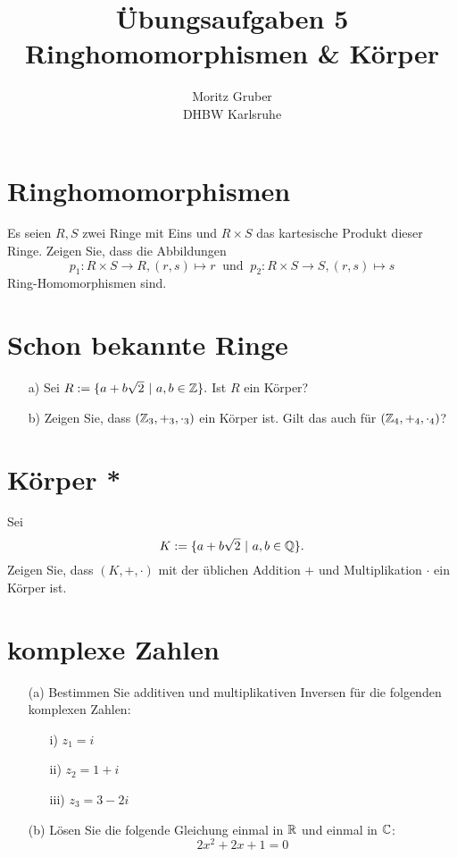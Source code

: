 \documentclass[
				a4paper,
				10pt
			]
			{scrartcl}
\author{Moritz Gruber\\ DHBW Karlsruhe}
\title{\"Ubungsaufgaben 5\\ 
	Ringhomomorphismen \& K\"orper
}
\date{}
\begin{document}
\maketitle
\section{Ringhomomorphismen}
Es seien $R,S$ zwei Ringe mit Eins und $R\times S$ das kartesische Produkt dieser Ringe. Zeigen Sie, dass die Abbildungen
		$$p_1 : R\times S \to R, (r,s) \mapsto r \ \text{ und } \ p_2 : R\times S \to S, (r,s) \mapsto s$$
Ring-Homomorphismen sind.

\section{Schon bekannte Ringe}
\begin{itemize}
\item[a)] Sei
$
	R := \{ a + b\sqrt{2} ~|~a,b \in \mathbb{Z} \}. 
$
Ist $R$ ein K\"orper?
\item[b)]
Zeigen Sie, dass $(\mathbb{Z}_3,+_3,\cdot_3)$ ein K\"orper ist. Gilt das auch f\"ur $(\mathbb{Z}_4,+_4,\cdot_4)$?
\end{itemize}

\section{K\"orper *}

Sei
$$
	K := \{ a + b\sqrt{2} ~|~a,b \in \mathbb{Q} \}. 
$$
Zeigen Sie, dass $(K,+,\cdot)$ mit der \"ublichen Addition $+$ und Multiplikation $\cdot$ ein  K\"orper ist.
\newpage
\section{komplexe Zahlen}

\begin{itemize}
\item[(a)] Bestimmen Sie additiven und multiplikativen Inversen f\"ur die folgenden komplexen Zahlen:
\begin{itemize}
\item[i)] $z_1=i$
\item[ii)] $z_2=1+i$
\item[iii)] $z_3=3-2i$
\end{itemize}

\item[(b)] L\"osen Sie die folgende Gleichung einmal in $\mathbb{R}$ und einmal in $\mathbb{C}$:
$$
2x^2+2x+1=0
$$
\end{itemize}
\end{document}
